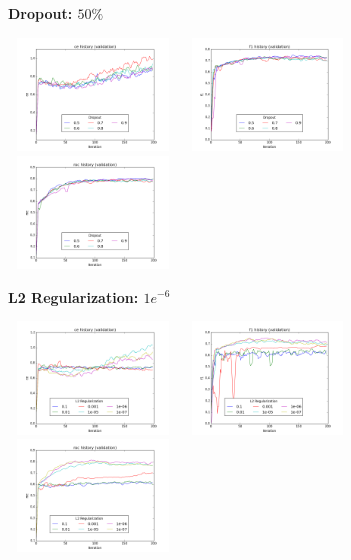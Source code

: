 \documentclass{article} %
\begin{document}
\begin{appendices}
\textbf{Dropout: $50\%$}

\includegraphics[width=4.5cm, height=3cm]{ce_history_validation_Dropout.png}
\includegraphics[width=4.5cm, height=3cm]{f1_history_validation_Dropout.png}
\includegraphics[width=4.5cm, height=3cm]{roc_history_validation_Dropout.png}

\textbf{L2 Regularization: $1e^{-6}$}

\includegraphics[width=4.5cm, height=3cm]{ce_history_validation_L2_Regularization.png}
\includegraphics[width=4.5cm, height=3cm]{f1_history_validation_L2_Regularization.png}
\includegraphics[width=4.5cm, height=3cm]{roc_history_validation_L2_Regularization.png}


\end{appendices}
\end{document}
